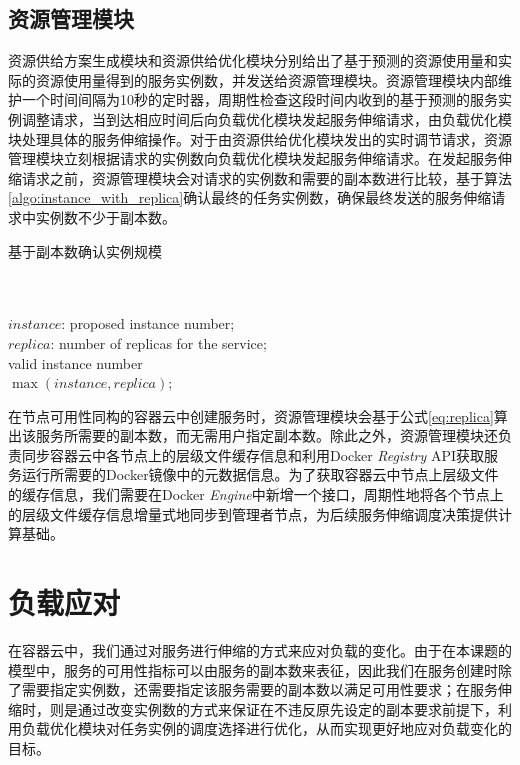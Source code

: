 \subsection{资源管理模块}\label{sec:provision_utils}
资源供给方案生成模块和资源供给优化模块分别给出了基于预测的资源使用量和实际的资源使用量得到的服务实例数，并发送给资源管理模块。资源管理模块内部维护一个时间间隔为10秒的定时器，周期性检查这段时间内收到的基于预测的服务实例调整请求，当到达相应时间后向负载优化模块发起服务伸缩请求，由负载优化模块处理具体的服务伸缩操作。对于由资源供给优化模块发出的实时调节请求，资源管理模块立刻根据请求的实例数向负载优化模块发起服务伸缩请求。在发起服务伸缩请求之前，资源管理模块会对请求的实例数和需要的副本数进行比较，基于算法\ref{algo:instance_with_replica}确认最终的任务实例数，确保最终发送的服务伸缩请求中实例数不少于副本数。
\begin{algorithm}[H]
\caption{基于副本数确认实例规模}
\label{algo:instance_with_replica}
\begin{algorithmic}[0]
\\
\Require ~~\
\\
$instance$: proposed instance number;\\
$replica$: number of replicas for the service;
\Ensure ~~\
\\
valid instance number\\

\State \Return $\max {(instance, replica)}$;
\end{algorithmic}
\end{algorithm}
在节点可用性同构的容器云中创建服务时，资源管理模块会基于公式\ref{eq:replica}算出该服务所需要的副本数，而无需用户指定副本数。除此之外，资源管理模块还负责同步容器云中各节点上的层级文件缓存信息和利用Docker \emph{Registry} API获取服务运行所需要的Docker镜像中的元数据信息。为了获取容器云中节点上层级文件的缓存信息，我们需要在Docker \emph{Engine}中新增一个接口，周期性地将各个节点上的层级文件缓存信息增量式地同步到管理者节点，为后续服务伸缩调度决策提供计算基础。

\section{负载应对}
在容器云中，我们通过对服务进行伸缩的方式来应对负载的变化。由于在本课题的模型中，服务的可用性指标可以由服务的副本数来表征，因此我们在服务创建时除了需要指定实例数，还需要指定该服务需要的副本数以满足可用性要求；在服务伸缩时，则是通过改变实例数的方式来保证在不违反原先设定的副本要求前提下，利用负载优化模块对任务实例的调度选择进行优化，从而实现更好地应对负载变化的目标。

